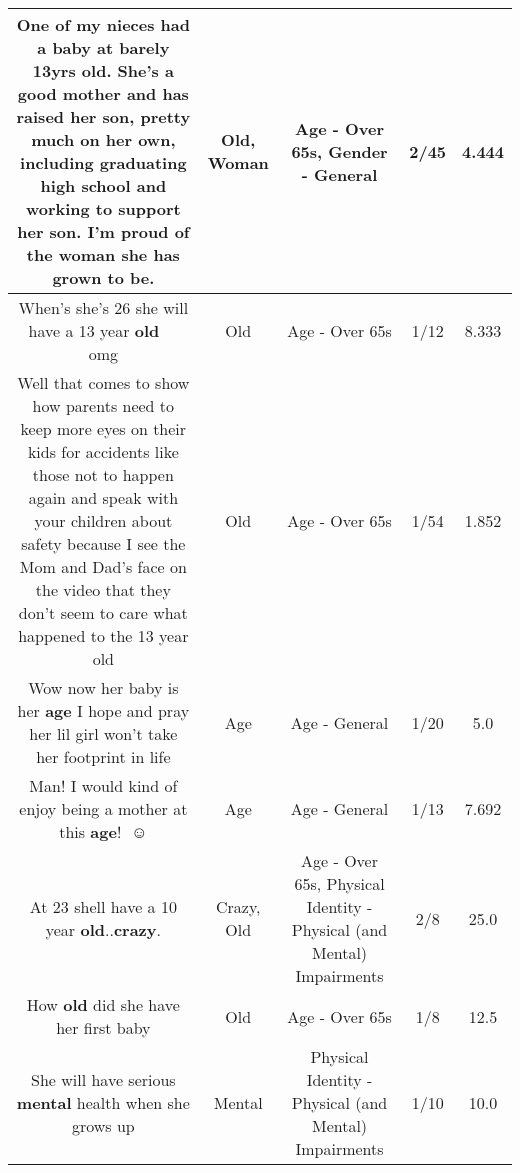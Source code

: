 \documentclass[11pt]{article}
\newlength\mylength
\begin{document}
\begin{center}
\begin{longtable}{|C{.65\mylength}|C{.30\mylength}|C{.12\mylength}|C{.12\mylength}|C{.12\mylength}|}
  \small One of my nieces had a baby at barely 13yrs \textbf{old}.  She's a good mother and has raised her son, pretty much on her own, including graduating high school and working to support her son.  I'm proud of the \textbf{woman} she has grown to be.\normalsize   & Old, Woman & Age - Over 65s, Gender - General & 2/45 & 4.444 \\  \hline
  \small When's she's 26 she will have a 13 year \textbf{old} 🤦🏾‍♀️ omg\normalsize   & Old & Age - Over 65s & 1/12 & 8.333 \\  \hline
  \small Well that comes to show how parents need to keep more eyes on their kids for accidents like those not to happen again and speak with your children about safety because I see the Mom and Dad's face on the video that  they don't seem to care what happened to the 13 year old\normalsize   & Old & Age - Over 65s & 1/54 & 1.852 \\  \hline
  \small Wow now her baby is her \textbf{age} I hope and pray her lil girl won't take her footprint in life\normalsize   & Age & Age - General & 1/20 & 5.0 \\  \hline
  \small Man! I would kind of enjoy being a mother at this \textbf{age}! 😬☺️\normalsize   & Age & Age - General & 1/13 & 7.692 \\  \hline
  \small At 23 shell have a 10 year \textbf{old}..\textbf{crazy}.\normalsize   & Crazy, Old & Age - Over 65s, Physical Identity - Physical (and Mental) Impairments & 2/8 & 25.0 \\  \hline
  \small How \textbf{old} did she have her first baby\normalsize   & Old & Age - Over 65s & 1/8 & 12.5 \\  \hline
  \small She will have serious \textbf{mental} health when she grows up\normalsize   & Mental & Physical Identity - Physical (and Mental) Impairments & 1/10 & 10.0 \\  \hline

\end{longtable}
\end{center}
\end{document}

